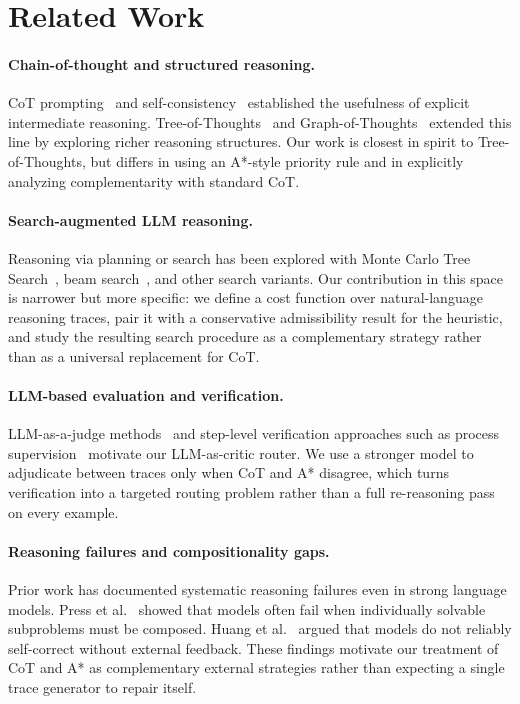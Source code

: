 \documentclass[11pt]{article}
\begin{document}
\section{Related Work}
\label{sec:related}

\paragraph{Chain-of-thought and structured reasoning.}
CoT prompting~\cite{wei2022chain} and self-consistency~\cite{wang2022self} established the usefulness of explicit intermediate reasoning. Tree-of-Thoughts~\cite{yao2024tree} and Graph-of-Thoughts~\cite{besta2024graph} extended this line by exploring richer reasoning structures. Our work is closest in spirit to Tree-of-Thoughts, but differs in using an A*-style priority rule and in explicitly analyzing complementarity with standard CoT.

\paragraph{Search-augmented LLM reasoning.}
Reasoning via planning or search has been explored with Monte Carlo Tree Search~\cite{hao2023reasoning}, beam search~\cite{xie2024self}, and other search variants. Our contribution in this space is narrower but more specific: we define a cost function over natural-language reasoning traces, pair it with a conservative admissibility result for the heuristic, and study the resulting search procedure as a complementary strategy rather than as a universal replacement for CoT.

\paragraph{LLM-based evaluation and verification.}
LLM-as-a-judge methods~\cite{zheng2023judging} and step-level verification approaches such as process supervision~\cite{lightman2023let} motivate our LLM-as-critic router. We use a stronger model to adjudicate between traces only when CoT and A* disagree, which turns verification into a targeted routing problem rather than a full re-reasoning pass on every example.

\paragraph{Reasoning failures and compositionality gaps.}
Prior work has documented systematic reasoning failures even in strong language models. Press et al.~\cite{press2023measuring} showed that models often fail when individually solvable subproblems must be composed. Huang et al.~\cite{huang2023large} argued that models do not reliably self-correct without external feedback. These findings motivate our treatment of CoT and A* as complementary external strategies rather than expecting a single trace generator to repair itself.
\end{document}
